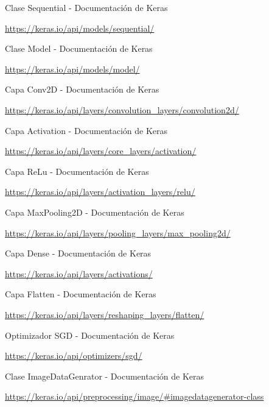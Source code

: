 \documentclass[12pt, spanish]{article}
\begin{document}
\begin{thebibliography}{9}

	Clase Sequential - Documentación de Keras

	\url{https://keras.io/api/models/sequential/}



	Clase Model - Documentación de Keras

	\url{https://keras.io/api/models/model/}


	Capa Conv2D - Documentación de Keras

	\url{https://keras.io/api/layers/convolution_layers/convolution2d/}



	Capa Activation - Documentación de Keras

	\url{https://keras.io/api/layers/core_layers/activation/}


	Capa ReLu - Documentación de Keras

	\url{https://keras.io/api/layers/activation_layers/relu/}


	Capa MaxPooling2D - Documentación de Keras

	\url{https://keras.io/api/layers/pooling_layers/max_pooling2d/}


	Capa Dense - Documentación de Keras

	\url{https://keras.io/api/layers/activations/}


	Capa Flatten - Documentación de Keras

	\url{https://keras.io/api/layers/reshaping_layers/flatten/}


	Optimizador SGD - Documentación de Keras

	\url{https://keras.io/api/optimizers/sgd/}


	Clase ImageDataGenrator - Documentación de Keras

	\url{https://keras.io/api/preprocessing/image/#imagedatagenerator-class}

\end{thebibliography}
\end{document}
